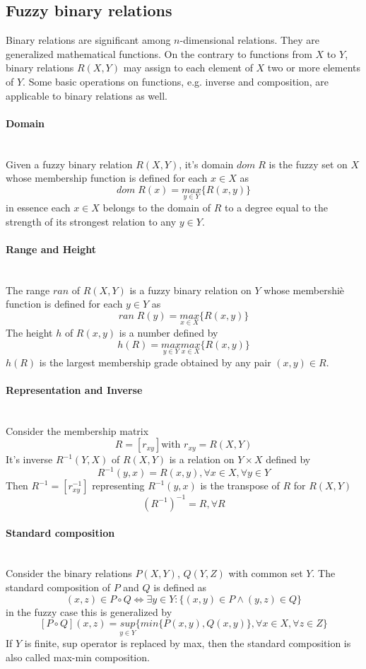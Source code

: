 \documentclass{article}
\begin{document}
\subsection{Fuzzy binary relations}
Binary relations are significant among $n$-dimensional relations. They are generalized mathematical functions.
On the contrary to functions from $X$ to $Y$, binary relations $R(X,Y)$ may assign to each element of $X$
two or more elements of $Y$.
Some basic operations on functions, e.g. inverse and composition, are applicable to binary relations as well.
\paragraph{Domain}\mbox{}\\
Given a fuzzy binary relation $R(X,Y)$, it's domain $dom\;R$ is the fuzzy set on $X$ whose
membership function is defined for each $x\in X$ as
$$dom\;R(x)=\underset{y\in Y}{max}\{R(x,y)\}$$
in essence each $x\in X$ belongs to the domain of $R$ to a degree equal to the strength of its
strongest relation to any $y\in Y$.

\paragraph{Range and Height}\mbox{}\\
The range $ran$ of $R(X,Y)$ is a fuzzy binary relation on $Y$ whose membershiè function is
defined for each $y\in Y$ as
$$ran\;R(y)=\underset{x\in X}{max}\{R(x,y)\}$$
The height $h$ of $R(x,y)$ is a number defined by
$$h(R)=\underset{y\in Y}{max}\underset{x\in X}{max}\{R(x,y)\}$$
$h(R)$ is the largest membership grade obtained by any pair $(x,y)\in R$.

\paragraph{Representation and Inverse}\mbox{}\\
Consider the membership matrix
$$R=[r_{xy}]\text{with }r_{xy}=R(X,Y)$$
It's inverse $R^{-1}(Y,X)$ of $R(X,Y)$ is a relation on $Y\times X$ defined by
$$R^{-1}(y,x)=R(x,y),\forall x\in X,\forall y\in Y$$
Then $R^{-1}=[r_{xy}^{-1}]$ representing $R^{-1}(y,x)$ is the transpose of $R$ for $R(X,Y)$
$$(R^{-1})^{-1}=R,\forall R$$

\paragraph{Standard composition}\mbox{}\\
Consider the binary relations $P(X,Y)$, $Q(Y,Z)$ with common set $Y$. The standard composition
of $P$ and $Q$ is defined as
$$(x,z)\in P\circ Q\Leftrightarrow\exists y\in Y:\{(x,y)\in P\land (y,z)\in Q\}$$
in the fuzzy case this is generalized by
$$[P\circ Q](x,z)=\underset{y \in Y}{sup}\{min\{P(x,y),Q(x,y)\},\forall x\in X, \forall z\in Z\}$$
If $Y$ is finite, sup operator is replaced by max, then the standard composition is also called max-min
composition.
\end{document}
